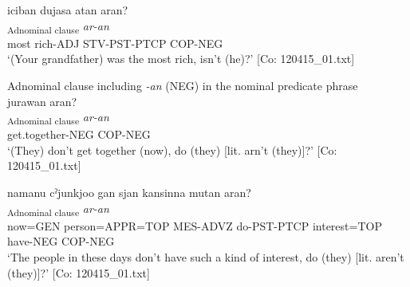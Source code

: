 \ex \label{ex:9.57e} %
 \glll  {\textbar}iciban{\textbar}  dujasa  atan  aran?\\
      [\textit{iciban}  \textit{duja-sa}  \textit{ar-tar-n}]\textsubscript{Adnominal clause}  \textit{ar-an}\\
      most  rich-ADJ  STV-PST-PTCP  COP-NEG\\
      \glt       ‘(Your grandfather) was the most rich, isn’t (he)?’ [Co: 120415\_01.txt]

\exi{}  Adnominal clause including \textit{-an} (NEG) in the nominal predicate phrase
\ex{}\\
    \glll  jurawan  aran?\\
      [\textit{juraw-an}]\textsubscript{Adnominal clause}  \textit{ar-an}\\
      get.together-NEG  COP-NEG\\
      \glt       ‘(They) don’t get together (now), do (they) [lit. arn’t (they)]?’ [Co: 120415\_01.txt]

\ex  %
     \glll namanu  cˀjunkjoo  gan  sjan  {\textbar}kansin{\textbar}na  mutan  aran?\\
      [\textit{nama=nu}  \textit{cˀju=nkja=ja}  \textit{ga-n}  \textit{sɨr-tar-n} \textit{kansin=ja}  \textit{mut-an}]\textsubscript{Adnominal clause}  \textit{ar-an}\\
      now=GEN  person=APPR=TOP  MES-ADVZ  do-PST-PTCP  interest=TOP  have-NEG  COP-NEG\\      
      \glt ‘The people in these days don’t have such a kind of interest, do (they) [lit. aren’t (they)]?’     [Co: 120415\_01.txt]
    \z
\z

